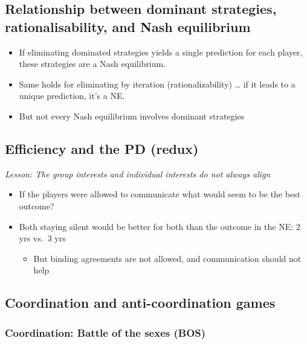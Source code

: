 \documentclass[]{article}
\providecommand{\tightlist}{%
  \setlength{\itemsep}{0pt}\setlength{\parskip}{0pt}}
\begin{document}
\hypertarget{relationship-between-dominant-strategies-rationalisability-and-nash-equilibrium}{%
\subsection{Relationship between dominant strategies, rationalisability, and Nash equilibrium}\label{relationship-between-dominant-strategies-rationalisability-and-nash-equilibrium}}

\begin{itemize}
\item
  If eliminating dominated strategies yields a single prediction for each player, these strategies are a Nash equilibrium.
\item
  Same holds for eliminating by iteration (rationalizability) \ldots{} if it leads to a unique prediction, it's a NE.
\item
  But not every Nash equilibrium involves dominant strategies
\end{itemize}

\hypertarget{efficiency-and-the-pd-redux}{%
\subsection{Efficiency and the PD (redux)}\label{efficiency-and-the-pd-redux}}

\emph{Lesson: The group interests and individual interests do not always align}

\begin{itemize}
\item
  If the players were allowed to communicate what would seem to be the best outcome?
\item
  Both staying silent would be better for both than the outcome in the NE: 2 yrs vs.~3 yrs

  \begin{itemize}
  \tightlist
  \item
    But binding agreements are not allowed, and communication should not help
  \end{itemize}
\end{itemize}

\hypertarget{coordination-and-anti-coordination-games}{%
\subsection{Coordination and anti-coordination games}\label{coordination-and-anti-coordination-games}}

\hypertarget{coordination-battle-of-the-sexes-bos}{%
\subsubsection{Coordination: Battle of the sexes (BOS)}\label{coordination-battle-of-the-sexes-bos}}
\end{document}
